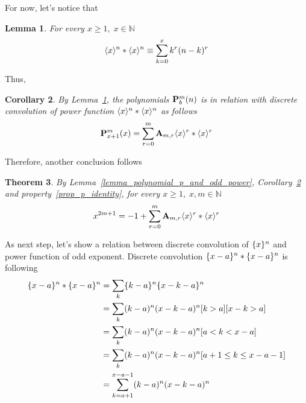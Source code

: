 \documentclass[12pt,letterpaper,oneside,reqno]{amsart}
\newcommand \anglePower [2]{\langle #1 \rangle \sp{#2}}
\newcommand \curvePower [2]{\{#1\}\sp{#2}}
\newcommand \coeffA [3][A] {{\mathbf{#1}} \sb{#2,#3}}
\newcommand \polynomialP [4][P]{{\mathbf{#1}}\sp{#2} \sb{#3}(#4)}
\newtheorem{thm}{Theorem}[section]
\newtheorem{cor}[thm]{Corollary}
\newtheorem{lem}[thm]{Lemma}
\numberwithin{equation}{section}
\begin{document}
    For now, let's notice that
    \begin{lem}
        \label{lemma_disc_conv_identity}
        For every $x\geq 1, \; x\in\mathbb{N}$
        \begin{equation*}
            \anglePower{x}{n} \ast \anglePower{x}{n} \equiv \sum_{k=0}^{x} k^r (n-k)^r
        \end{equation*}
    \end{lem}
    Thus,
    \begin{cor}
        \label{cor_polynomial_p_and_macaulay_convolution}
        By Lemma~\ref{lemma_disc_conv_identity}, the polynomials $\polynomialP{m}{b}{n}$ is in relation with discrete
        convolution of power function $\anglePower{x}{n} \ast \anglePower{x}{n}$ as follows
        \begin{equation*}
            \polynomialP{m}{x+1}{x} = \sum_{r=0}^{m} \coeffA{m}{r} \anglePower{x}{r} \ast \anglePower{x}{r}
        \end{equation*}
    \end{cor}
    Therefore, another conclusion follows
    \begin{thm}
        \label{thm_odd_power_by_macaulays_convolution}
        By Lemma~\ref{lemma_polynomial_p_and_odd_power}, Corollary~\ref{cor_polynomial_p_and_macaulay_convolution}
        and property~\ref{prop_p_identity}, for every $x\geq 1, \; x,m\in\mathbb{N}$
        \begin{equation*}
            x^{2m+1} = -1 + \sum_{r=0}^{m} \coeffA{m}{r} \anglePower{x}{r} \ast \anglePower{x}{r}
        \end{equation*}
    \end{thm}
    As next step, let's show a relation between discrete convolution of $\curvePower{x}{n}$ and power function
    of odd exponent.
    Discrete convolution $\curvePower{x-a}{n} \ast \curvePower{x-a}{n}$ is following
    \begin{equation*}
        \begin{split}
            \curvePower{x-a}{n} \ast \curvePower{x-a}{n}
            &=\sum_{k} \curvePower{k-a}{n} \curvePower{x-k-a}{n} \\
            &=\sum_{k} (k-a)^n (x-k-a)^n [k > a] [x-k > a] \\
            &=\sum_{k} (k-a)^n (x-k-a)^n [a < k < x-a] \\
            &=\sum_{k} (k-a)^n (x-k-a)^n [a+1 \leq k \leq x-a-1] \\
            &=\sum_{k=a+1}^{x-a-1} (k-a)^n (x-k-a)^n
        \end{split}
    \end{equation*}
\end{document}

